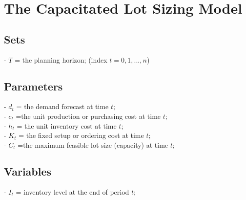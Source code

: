 \documentclass[a4paper,12pt,titlepage]{article}
\begin{document}
	\section*{The Capacitated Lot Sizing Model}
	\subsection*{Sets}
	- $T$ = the planning horizon; (index $t=0,1,...,n$)
	\subsection*{Parameters}
	- $d_t$ = the demand forecast at time $t$;\\
	
	- $c_t$ =the unit production or purchasing cost at time $t$;\\
	
	- $h_t$ = the unit inventory cost at time $t$;\\
	
	- $K_t$ = the fixed setup or ordering cost at time $t$;\\
	
	- $C_t$ =the maximum feasible lot size (capacity) at time $t$;\\
	\subsection*{Variables}
	- $I_t$ = inventory level at the end of period $t$;\\
	
\end{document}
